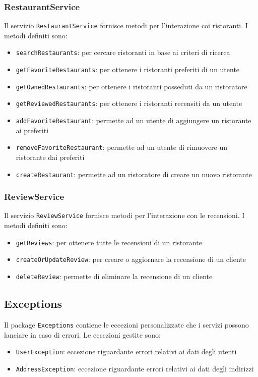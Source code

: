 \subsubsection{RestaurantService}
\label{sec:restaurantservice}
Il servizio \texttt{RestaurantService} fornisce metodi per 
l'interazione coi ristoranti.
I metodi definiti sono:
\begin{itemize}
    \item \texttt{searchRestaurants}: per cercare ristoranti in base ai criteri di ricerca
    \item \texttt{getFavoriteRestaurants}: per ottenere i ristoranti preferiti di un utente
    \item \texttt{getOwnedRestaurants}: per ottenere i ristoranti posseduti da un ristoratore
    \item \texttt{getReviewedRestaurants}: per ottenere i ristoranti recensiti da un utente
    \item \texttt{addFavoriteRestaurant}: permette ad un utente di aggiungere un ristorante ai preferiti
    \item \texttt{removeFavoriteRestaurant}: permette ad un utente di rimuovere un ristorante dai preferiti
    \item \texttt{createRestaurant}: permette ad un ristoratore di creare un nuovo ristorante
\end{itemize}

\subsubsection{ReviewService}
\label{sec:reviewservice}
Il servizio \texttt{ReviewService} fornisce metodi per 
l'interazione con le recensioni.
I metodi definiti sono:
\begin{itemize}
    \item \texttt{getReviews}: per ottenere tutte le recensioni di un ristorante
    \item \texttt{createOrUpdateReview}: per creare o aggiornare la recensione di un cliente
    \item \texttt{deleteReview}: permette di eliminare la recensione di un cliente
\end{itemize}

\subsection{Exceptions}
Il package \texttt{Exceptions} contiene le eccezioni personalizzate 
che i servizi possono lanciare in caso di errori.
Le eccezioni gestite sono:
\begin{itemize}
    \item \texttt{UserException}: eccezione riguardante errori relativi ai dati degli utenti
    \item \texttt{AddressException}: eccezione riguardante errori relativi ai dati degli indirizzi
\end{itemize}
